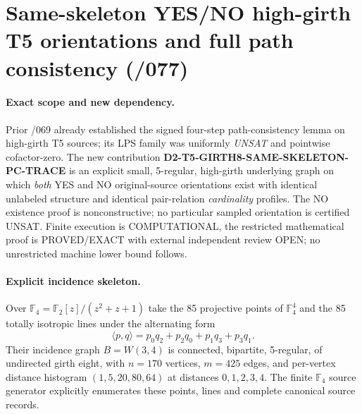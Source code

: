 \documentclass[11pt]{article}
\begin{document}
\section{Same-skeleton YES/NO high-girth T5 orientations and full path consistency (/077)}
\paragraph{Exact scope and new dependency.}
Prior /069 already established the signed four-step path-consistency
lemma on high-girth T5 sources; its LPS family was uniformly
\emph{UNSAT} and pointwise cofactor-zero. The new contribution
\textbf{D2-T5-GIRTH8-SAME-SKELETON-PC-TRACE} is an explicit small,
5-regular, high-girth underlying graph on which \emph{both} YES and
NO original-source orientations exist with identical unlabeled
structure and identical pair-relation \emph{cardinality} profiles.
The NO existence proof is nonconstructive; no particular sampled
orientation is certified UNSAT. Finite execution is COMPUTATIONAL,
the restricted mathematical proof is PROVED/EXACT with external
independent review OPEN; no unrestricted machine lower bound follows.

\paragraph{Explicit incidence skeleton.}
Over $\mathbb F_4=\mathbb F_2[z]/(z^2+z+1)$
take the 85 projective points of $\mathbb F_4^4$ and
the 85 totally isotropic lines under the alternating form
\[
\langle p,q\rangle=p_0q_2+p_2q_0+p_1q_3+p_3q_1.
\]
Their incidence graph $B=W(3,4)$ is connected, bipartite,
5-regular, of undirected girth eight, with $n=170$ vertices,
$m=425$ edges, and per-vertex distance histogram
$(1,5,20,80,64)$ at distances $0,1,2,3,4$.
The finite $\mathbb F_4$ source generator explicitly enumerates
these points, lines and complete canonical source records.
\end{document}
